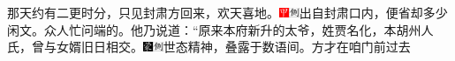 {那天约有二更时分，只见封肃方回来，欢天喜地。{\includegraphics[width=3mm]{../Images/00002}\includegraphics[width=3mm]{../Images/00011}\footnotesize \kaishu 出自封肃口内，便省却多少闲文。}众人忙问端的。他乃说道：``原来本府新升的太爷，姓贾名化，本胡州人氏，曾与女婿旧日相交。{\includegraphics[width=3mm]{../Images/00006}\includegraphics[width=3mm]{../Images/00011}\footnotesize \kaishu 世态精神，叠露于数语间。}方才在咱门前过去}
